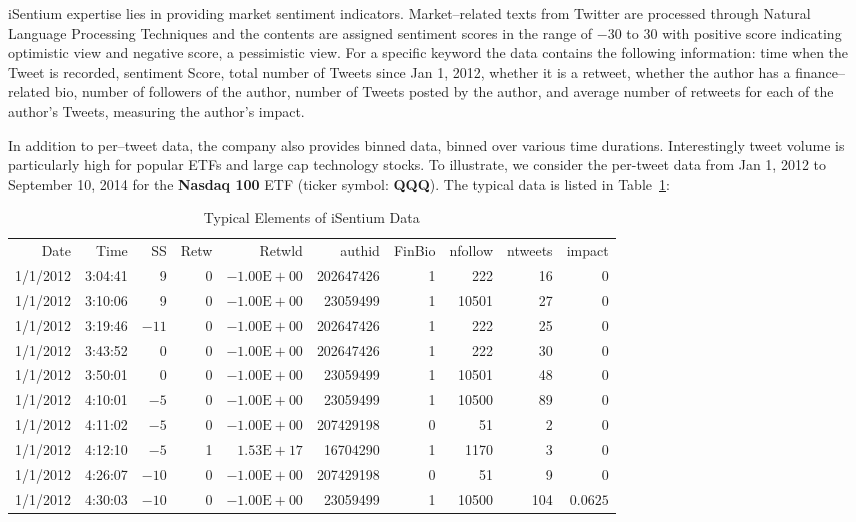 iSentium expertise lies in providing market sentiment indicators. Market--related texts from Twitter are processed through Natural Language Processing Techniques and the contents are assigned sentiment scores in the range of $-30$ to $30$ with positive score indicating optimistic view and negative score, a pessimistic view. For a specific keyword the data contains the following information: time when the Tweet is recorded, sentiment Score, total number of Tweets since Jan 1, 2012, whether it is a retweet, whether the author has a finance--related bio, number of followers of the author, number of Tweets posted by the author, and average number of retweets for each of the author's Tweets, measuring the author's impact.

In addition to per--tweet data, the company also provides binned data, binned over various time durations. Interestingly tweet volume is particularly high for popular ETFs and large cap technology stocks. To illustrate, we consider the per-tweet data from Jan 1, 2012 to September 10, 2014 for the \textbf{Nasdaq 100} ETF (ticker symbol: \textbf{QQQ}). The typical data is listed in Table~\ref{tab:isentiumdata}:

        \begin{table}[!ht]
        \centering
        \caption{Typical Elements of iSentium Data \label{tab:isentiumdata}}
        \hspace*{-1.8cm}
        \begin{tabular}{rrrrrrrrrr}
        Date & Time & SS & Retw & Retwld & authid & FinBio & nfollow & ntweets & impact \\
        1/1/2012 & 3:04:41 & 9 & 0 & $-1.00\text{E}+00$ & 202647426 & 1 & 222 & 16 & 0 \\
        1/1/2012 & 3:10:06 & 9 & 0 & $-1.00\text{E}+00$ & 23059499 & 1 & 10501 & 27 & 0 \\
        1/1/2012 & 3:19:46 & $-11$ & 0 & $-1.00\text{E}+00$ & 202647426 & 1 & 222 & 25 & 0 \\
        1/1/2012 & 3:43:52 & 0 & 0 & $-1.00\text{E}+00$ & 202647426 & 1 & 222 & 30 & 0 \\
        1/1/2012 & 3:50:01 & 0 & 0 & $-1.00\text{E}+00$ & 23059499 & 1 & 10501 & 48 & 0 \\
        1/1/2012 & 4:10:01 & $-5$ & 0 & $-1.00\text{E}+00$ & 23059499 & 1 & 10500 & 89 & 0 \\
        1/1/2012 & 4:11:02 &  $-5$ & 0 & $-1.00\text{E}+00$ & 207429198 & 0 & 51 & 2 & 0 \\
        1/1/2012 & 4:12:10 &  $-5$ & 1 & $1.53\text{E}+17$ & 16704290 & 1& 1170 & 3 & 0 \\
        1/1/2012 & 4:26:07 & $-10$ & 0 & $-1.00\text{E}+00$ & 207429198 & 0 & 51 & 9 & 0 \\
        1/1/2012 & 4:30:03 & $-10$ & 0 & $-1.00\text{E}+00$ & 23059499 &	1 & 10500	 & 104 & $0.0625$ 
        \end{tabular}
        \end{table}


